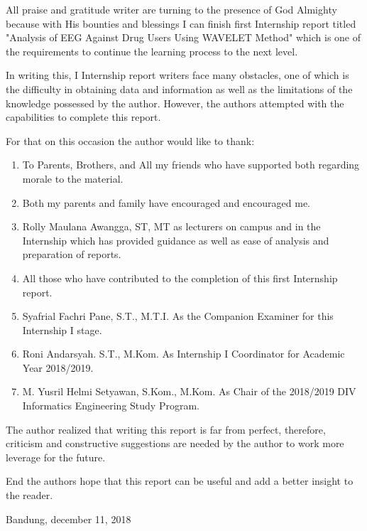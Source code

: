 \begin{acknowledgements}
All praise and gratitude writer are turning to the presence of God Almighty because with His bounties and blessings I can finish first Internship report titled "Analysis of EEG Against Drug Users Using WAVELET Method" which is one of the requirements to continue the learning process to the next level. 
\par
In writing this, I Internship report writers face many obstacles, one of which is the difficulty in obtaining data and information as well as the limitations of the knowledge possessed by the author. However, the authors attempted with the capabilities to complete this report.
\par
For that on this occasion the author would like to thank:

\begin{enumerate}
    \item To Parents, Brothers, and All my friends who have supported both regarding morale to the material.
    \item Both my parents and family have encouraged and encouraged me.
    \item Rolly Maulana Awangga, ST, MT as lecturers on campus and in the Internship which has provided guidance as well as ease of analysis and preparation of reports.
    \item All those who have contributed to the completion of this first Internship report.
    \item Syafrial Fachri Pane, S.T., M.T.I. As the Companion Examiner for this Internship I stage.
    \item Roni Andarsyah. S.T., M.Kom. As Internship I Coordinator for Academic Year 2018/2019.
    \item M. Yusril Helmi Setyawan, S.Kom., M.Kom. As Chair of the 2018/2019 DIV Informatics Engineering Study Program.
    \end{enumerate}
\par
The author realized that writing this report is far from perfect, therefore, criticism and constructive suggestions are needed by the author to work more leverage for the future. 
\par
End the authors hope that this report can be useful and add a better insight to the reader. 

\par
\begin{raggedleft}
Bandung, december 11, 2018

\end{raggedleft}


\end{acknowledgements}

